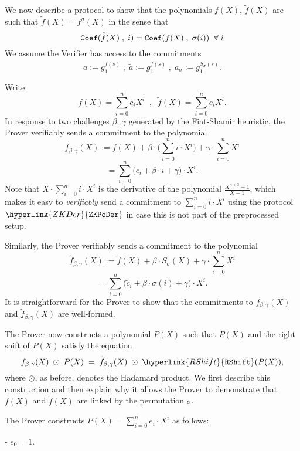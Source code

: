 \documentclass[11pt, lettersize, notitlepage, leqno, footskip=0.6cm]{article}
\newcommand{\wti}{\widetilde}
\newcommand{\be}{\beta}
\newcommand{\vs}{\vspace{-0.15cm}}
\newcommand{\noin}{\noindent}
\numberwithin{equation}{section}
\begin{document}
We now describe a protocol to show that the polynomials $f(X)$, $\wti{f}(X)$ are such that $\wti{f}(X) = f^{\sigma}(X)$ in the sense that \vs $$ {\tt{Coef}}(\wti{f}(X)\;,\;i) =  {\tt{Coef}}(f(X)\;,\;\sigma(i))\;\;\forall\;i  $$ We assume the Verifier has access to the commitments $$a:= g_1^{f(s)}\;,\; \wti{a}:= g_1^{\wti{f}(s)}\;,\;a_{\sigma}:= g_1^{S_{\sigma}(s)}. $$




\noin Write \vs $$f(X) = \sum\limits_{i=0}^{n} c_i X^i\;\;,\;\; \wti{f}(X) = \sum\limits_{i=0}^{n} \wti{c}_i X^i.$$ In response to two challenges $\be$, $\gamma$ generated by the Fiat-Shamir heuristic, the Prover verifiably sends a commitment to the polynomial \vs $$ f_{\be,\gamma}(X):= f(X)+\be\cdot \big(\sum\limits_{i=0}^{n} i\cdot X^i\big)+\gamma\cdot \sum\limits_{i=0}^{n} X^i $$ \vspace{-3mm}  $$ = \sum\limits_{i=0}^{n} \big(c_i+\be\cdot i + \gamma\big)\cdot X^i. $$ Note that $X\cdot \sum_{i=0}^{n} i\cdot X^i$ is the derivative of the polynomial $\frac{X^{n+3}-1}{X-1}$, which makes it easy to \textit{verifiably} send a commitment to $\sum_{i=0}^{n} i\cdot X^i$ using the protocol $\hyperlink{ZKDer}{\tt{{ZKPoDer}}}$ in case this is not part of the preprocessed setup.

Similarly, the Prover verifiably sends a commitment to the polynomial \vs $$ \wti{f}_{\be,\gamma}(X):= \wti{f}(X)+\be\cdot S_{\sigma}(X)+\gamma\cdot \sum\limits_{i=0}^{n}  X^i$$ \vspace{-3mm}  $$ = \sum\limits_{i=0}^{n} \big(\wti{c}_i+\be\cdot \sigma(i) + \gamma\big)\cdot X^i. $$ It is straightforward for the Prover to show that the commitments to $f_{\be,\gamma}(X)$ and $\wti{f}_{\be,\gamma}(X)$ are well-formed.

The Prover now constructs a polynomial $P(X)$ such that $P(X)$ and the right shift of $P(X)$ satisfy the equation \vspace{-2mm} $$f_{\be,\gamma}(X)\;\odot\; P(X) \;=\; \wti{f}_{\be,\gamma}(X) \;\odot\; \hyperlink{RShift}{{\tt{RShift}}}(P(X)),   $$ where $\odot$, as before, denotes the Hadamard product. We first describe this construction and then explain why it allows the Prover to demonstrate that $f(X)$ and $\wti{f}(X)$ are linked by the permutation $\sigma$.

The Prover constructs $P(X) = \sum_{i=0}^{n} e_i\cdot X^i  $ as follows: \vspace{2mm}

\noin - $e_0 = 1$. \vspace{1mm}
\end{document}
